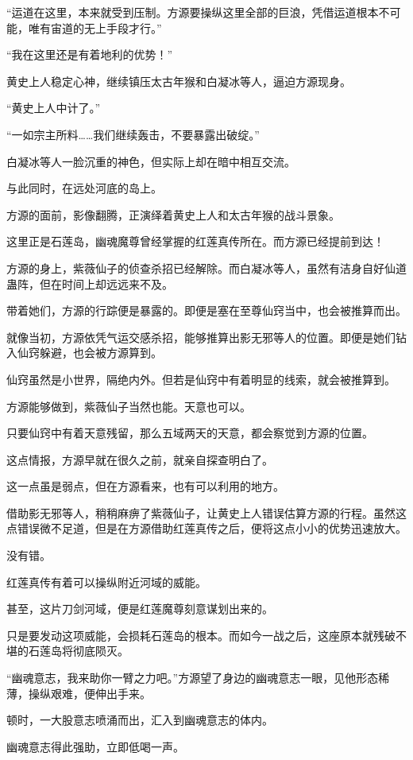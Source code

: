\begin{this_body}
“运道在这里，本来就受到压制。方源要操纵这里全部的巨浪，凭借运道根本不可能，唯有宙道的无上手段才行。”

“我在这里还是有着地利的优势！”

黄史上人稳定心神，继续镇压太古年猴和白凝冰等人，逼迫方源现身。

“黄史上人中计了。”

“一如宗主所料……我们继续轰击，不要暴露出破绽。”

白凝冰等人一脸沉重的神色，但实际上却在暗中相互交流。

与此同时，在远处河底的岛上。

方源的面前，影像翻腾，正演绎着黄史上人和太古年猴的战斗景象。

这里正是石莲岛，幽魂魔尊曾经掌握的红莲真传所在。而方源已经提前到达！

方源的身上，紫薇仙子的侦查杀招已经解除。而白凝冰等人，虽然有洁身自好仙道蛊阵，但在时间上却远远来不及。

带着她们，方源的行踪便是暴露的。即便是塞在至尊仙窍当中，也会被推算而出。

就像当初，方源依凭气运交感杀招，能够推算出影无邪等人的位置。即便是她们钻入仙窍躲避，也会被方源算到。

仙窍虽然是小世界，隔绝内外。但若是仙窍中有着明显的线索，就会被推算到。

方源能够做到，紫薇仙子当然也能。天意也可以。

只要仙窍中有着天意残留，那么五域两天的天意，都会察觉到方源的位置。

这点情报，方源早就在很久之前，就亲自探查明白了。

这一点虽是弱点，但在方源看来，也有可以利用的地方。

借助影无邪等人，稍稍麻痹了紫薇仙子，让黄史上人错误估算方源的行程。虽然这点错误微不足道，但是在方源借助红莲真传之后，便将这点小小的优势迅速放大。

没有错。

红莲真传有着可以操纵附近河域的威能。

甚至，这片刀剑河域，便是红莲魔尊刻意谋划出来的。

只是要发动这项威能，会损耗石莲岛的根本。而如今一战之后，这座原本就残破不堪的石莲岛将彻底陨灭。

“幽魂意志，我来助你一臂之力吧。”方源望了身边的幽魂意志一眼，见他形态稀薄，操纵艰难，便伸出手来。

顿时，一大股意志喷涌而出，汇入到幽魂意志的体内。

幽魂意志得此强助，立即低喝一声。


\end{this_body}
